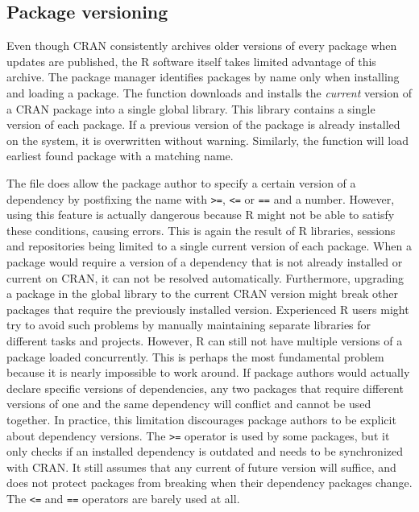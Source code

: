 
\subsection{Package versioning}

Even though CRAN consistently archives older versions of every package when
updates are published, the R software itself takes limited advantage of this
archive. The package manager identifies packages by name only when installing
and loading a package. The  function downloads and
installs the \emph{current} version of a CRAN package into a single global
library. This library contains a single version of each package. If a previous
version of the package is already installed on the system, it is overwritten
without warning. Similarly, the  function will load earliest
found package with a matching name.

The  file does allow the package author to specify a certain
version of a dependency by postfixing the name with \texttt{>=}, \texttt{<=} or
\texttt{==} and a number. However, using this feature is actually dangerous
because R might not be able to satisfy these conditions, causing errors. This is
again the result of R libraries, sessions and repositories being limited to a
single current version of each package. When a package would require a version
of a dependency that is not already installed or current on CRAN, it can not be
resolved automatically. Furthermore, upgrading a package in the global library
to the current CRAN version might break other packages that require the
previously installed version. Experienced R users might try to avoid such
problems by manually maintaining separate libraries for different tasks and
projects. However, R can still not have multiple versions of a package loaded
concurrently. This is perhaps the most fundamental problem because it is nearly
impossible to work around. If package authors would actually declare specific
versions of dependencies, any two packages that require different versions of
one and the same dependency will conflict and cannot be used together. In
practice, this limitation discourages package authors to be explicit about
dependency versions. The \texttt{>=} operator is used by some packages, but
it only checks if an installed dependency is outdated and needs to be
synchronized with CRAN. It still assumes that any current of future version will
suffice, and does not protect packages from breaking when their dependency
packages change. The \texttt{<=} and \texttt{==} operators are barely used at
all.

